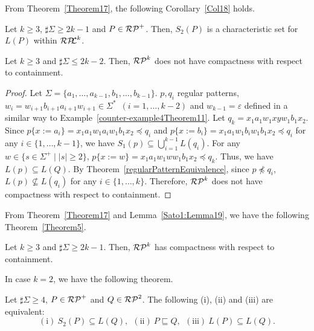 From Theorem~\ref{Theorem17}, 
the following Corollary~\ref{Col18} holds.


\begin{col}\label{Col18}
    Let $k \geq 3$, $\sharp\Sigma \geq 2k-1$ and $P \in \mathcal{RP}^{+}$.
    Then, $S_{2}(P)$ is a characteristic set for $L(P)$ within $\mathcal{RP\!\!L}^{k}$.
\end{col}


\begin{lem}\label{Sato1:Lemma19}%
    Let $k \geq 3$ and $\sharp\Sigma \leq 2k-2$.
    Then, $\mathcal{RP}^{k}$ does not have compactness with respect to containment.
\end{lem}

\begin{proof}
    Let $\Sigma =\{a_{1},\ldots,a_{k-1},b_{1},\ldots,b_{k-1}\}${\color{red}. 
    $p, q_{i}$ regular patterns, $w_{i}=w_{i+1}b_{i+1}a_{i+1}w_{i+1} \in \Sigma^{\ast}$\ $(i=1,\ldots,k-2)$ and $w_{k-1}=\varepsilon$}
    defined in a similar way to Example~\ref{counter-example4Theorem11}. %
    Let $q_{k}=x_{1}a_{1}w_{1}xyw_{1}b_{1}x_{2}$.
    Since
    $p\{x:=a_{i}\} = x_{1}a_{1}w_{1}a_{i}w_{1}b_{1}x_{2} \preceq q_{i}$ and
    $p\{x:=b_{i}\} = x_{1}a_{1}w_{1}b_{i}w_{1}b_{1}x_{2} \preceq q_{i}$
    for any $i \in \{1,\ldots,k-1\}$,
    we have $S_{1}(p) \subseteq \bigcup_{i=1}^{k-1}L(q_{i})$.
    For any $w \in \{s \in \Sigma^{+} \mid |s| \geq 2\}$,
    $p\{x:=w\}=x_{1}a_{1}w_{1}ww_{1}b_{1}x_{2} \preceq q_{k}$.
    Thus, we have $L(p) \subseteq L(Q)$.
    By Theorem~\ref{regularPatternEquivalence},
    since $p \not \preceq q_{i}$, $L(p) \not \subseteq L(q_{i})$
    for any $i \in \{1,\ldots, k\}$.
    Therefore, $\mathcal{RP}^{k}$ does not have compactness with respect to containment.
\end{proof}

From Theorem~\ref{Theorem17} and Lemma~\ref{Sato1:Lemma19}, 
we have the following Theorem~\ref{Theorem5}.

\begin{thm}\label{Theorem5}
    Let $k \geq 3$ and $\sharp\Sigma \geq 2k-1$.
    Then, $\mathcal{RP}^{k}$ has compactness with respect to containment.
\end{thm}

In case $k=2$, we have the following theorem.

\begin{thm}\label{Theorem21}
    Let $\sharp\Sigma \geq 4$, $P \in \mathcal{RP}^{+}$ and $Q \in \mathcal{RP}^{2}$.
    The following (i), (ii) and (iii) are equivalent:
    \[
        \mathrm{(i)}\ S_{2}(P) \subseteq L(Q),\ \
        \mathrm{(ii)}\ P \sqsubseteq Q, \ \
        \mathrm{(iii)}\ L(P) \subseteq L(Q).
    \]
\end{thm}

